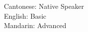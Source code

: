 {\small
  Cantonese: Native Speaker\\[5pt]
  English: Basic\\[5pt]
  Mandarin: Advanced%
}
\par\vspace{5pt}
